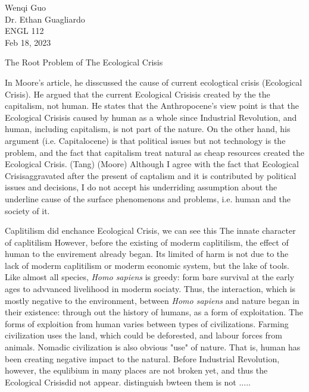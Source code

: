 \documentclass[12pt]{article}
\newcommand{\IR}{Industrial Revolution}
\newcommand{\EC}{Ecological Crisis}
\begin{document}
\begin{flushleft}

Wenqi Guo\\
Dr. Ethan Guagliardo\\
ENGL 112\\
Feb 18, 2023\\

\begin{center}
The Root Problem of The Ecological Crisis
\end{center}



\setlength{\parindent}{0.5in}


In Moore's article, he disscussed the cause of current ecologtical crisis (\EC). He argued that the current \EC is created by the the capitalism, not human. He states that the Anthropocene’s view point is that the \EC is caused by human as a whole since Industrial Revolution, and human, including capitalism, is not part of the nature. On the other hand, his argument (i.e. Capitalocene) is that political issues but not technology is the problem, and the fact that capitalism treat natural as cheap resources created the \EC. (Tang) (Moore)
Although I agree with the fact that \EC aggravated after the present of captalism and it is contributed by political issues and decisions, I do not accept his underriding assumption about the underline cause of the surface phenomenons and problems, i.e. human and the society of it.

Caplitilism did enchance \EC, we can see this 
The innate character of caplitilism 
However, before the existing of moderm caplitilism, the effect of human to the envirement already began. Its limited of harm is not due to the lack of moderm caplitilism or moderm economic system, but the lake of tools. Like almost all species, \textit{Homo sapiens} is greedy: form bare survival at the early ages to advvanced livelihood in moderm sociaty. Thus, the interaction, which is mostly negative to the environment, between \textit{Homo sapiens} and nature began in their existence: through out the history of humans, as a form of exploitation. The forms of exploition from human varies between types of civilizations. Farming civilization uses the land, which could be deforested, and labour forces from animals. Nomadic civilization is also obvious "use" of nature. That is, human has been creating negative impact to the natural. Before \IR, however, the equlibium in many places are not broken yet, and thus the \EC did not appear. 
distinguish bwteen them is not .....
\\


\end{flushleft}
\end{document}
